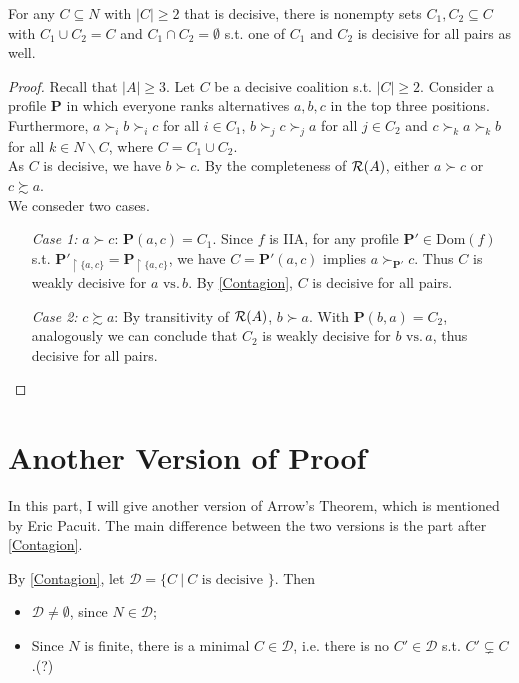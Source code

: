 \begin{lemma}
    \label{Splitting}
    For any $C \subseteq N$ with $|C| \geq 2$ that is decisive, there is nonempty sets $C_1, C_2 \subseteq C$ with $C_1 \cup C_2 = C$ and $C_1 \cap C_2 = \emptyset$ s.t. one of $C_1 \mbox{ and }C_2$ is decisive for all pairs as well.
\end{lemma}

\begin{proof}
    Recall that $|A| \geq 3$. Let $C$ be a decisive coalition s.t. $|C| \geq 2$. Consider a profile $\mathbf{P}$ in which everyone ranks alternatives $a,b,c$ in the top three positions. Furthermore, $a \succ_i b \succ_i c$ for all $i \in C_1$, $b \succ_j c \succ_j a$ for all $j \in C_2$ and $c \succ_k a \succ_k b$ for all $k \in N \backslash C$, where $C = C_1 \cup C_2$.\\
    As $C$ is decisive, we have $b \succ c$. By the completeness of $\mathcal{R}(A)$, either $a \succ c$ or $c \succsim a$. \\
    We conseder two cases.
    \begin{itemize}
        \item[\textit{Case 1:}] $a \succ c$: $\mathbf{P}(a,c) = C_1$. Since $f$ is IIA, for any profile $\mathbf{P'} \in \mathrm{Dom}(f)$ s.t. $\mathbf{P'}_{\upharpoonright\{a,c\}} = \mathbf{P}_{\upharpoonright\{a,c\}}$, we have $C = \mathbf{P'}(a,c)$ implies $a \succ_\mathbf{P'} c$. Thus $C$ is weakly decisive for $a \mbox{ vs.} \, b$. By \cref{Contagion}, $C$ is decisive for all pairs.
        \item[\textit{Case 2:}] $c \succsim a$: By transitivity of $\mathcal{R}(A)$, $b \succ a$. With $\mathbf{P}(b,a) = C_2$, analogously we can conclude that $C_2$ is weakly decisive for $b \mbox{ vs.} \, a$, thus decisive for all pairs.
    \end{itemize}
\end{proof}

\section{Another Version of Proof}

In this part, I will give another version of Arrow's Theorem, which is mentioned by Eric Pacuit. The main difference between the two versions is the part after \cref{Contagion}.

By \cref{Contagion}, let $\mathcal{D} = \{C \ |\ C \mbox{ is decisive }\}$. Then
\begin{itemize}
    \item $\mathcal{D} \neq \emptyset$, since $N \in \mathcal{D}$;
    \item Since $N$ is finite, there is a minimal $C \in \mathcal{D}$, i.e. there is no $C' \in \mathcal{D}$ s.t. $C' \subsetneq C$.(?)
\end{itemize}


